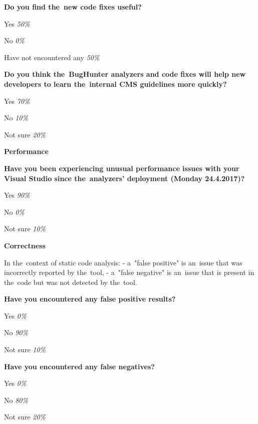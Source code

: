 \documentclass[
  digital, %
  table,   %
  lof,     %
  lot,     %
  oneside,
]{fithesis3}
\begin{document}
\smallskip\noindent
\textbf{Do you find the~new code fixes useful?}
\begin{compactitem}
\item Yes \textit{50\%}
\item No \textit{0\%}
\item Have not encountered any \textit{50\%}
\end{compactitem}

\smallskip\noindent
\textbf{Do you think the~BugHunter analyzers and code fixes will help new developers to learn the~internal CMS guidelines more quickly?}
\begin{compactitem}
\item Yes \textit{70\%}
\item No \textit{10\%}
\item Not sure \textit{20\%}
\end{compactitem}

\begin{center}
\textbf{Performance}
\end{center}

\smallskip\noindent
\textbf{Have you been experiencing unusual performance issues with your Visual Studio since the~analyzers' deployment (Monday 24.4.2017)?}
\begin{compactitem}
\item Yes \textit{90\%}
\item No \textit{0\%}
\item Not sure \textit{10\%}
\end{compactitem}

\begin{center}
\textbf{Correctness}
\end{center}

In the~context of static code analysis:
- a~"false positive" is an~issue that was incorrectly reported by the~tool,
- a~"false negative" is an~issue that is present in the~code but was not detected by the~tool.

\smallskip\noindent
\textbf{Have you encountered any false positive results?}
\begin{compactitem}
\item Yes \textit{0\%}
\item No \textit{90\%}
\item Not sure \textit{10\%}
\end{compactitem}

\smallskip\noindent
\textbf{Have you encountered any false negatives?}
\begin{compactitem}
\item Yes \textit{0\%}
\item No \textit{80\%}
\item Not sure \textit{20\%}
\end{compactitem}
\end{document}
